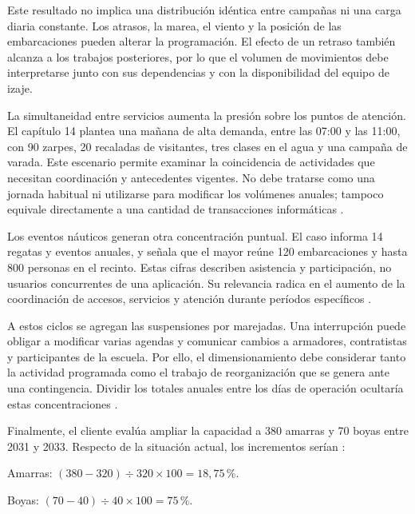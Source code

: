 Este resultado no implica una distribución idéntica entre campañas ni una carga diaria constante. Los atrasos, la marea, el viento y la posición de las embarcaciones pueden alterar la programación. El efecto de un retraso también alcanza a los trabajos posteriores, por lo que el volumen de movimientos debe interpretarse junto con sus dependencias y con la disponibilidad del equipo de izaje.

La simultaneidad entre servicios aumenta la presión sobre los puntos de atención. El capítulo 14 plantea una mañana de alta demanda, entre las 07:00 y las 11:00, con 90 zarpes, 20 recaladas de visitantes, tres clases en el agua y una campaña de varada. Este escenario permite examinar la coincidencia de actividades que necesitan coordinación y antecedentes vigentes. No debe tratarse como una jornada habitual ni utilizarse para modificar los volúmenes anuales; tampoco equivale directamente a una cantidad de transacciones informáticas \parencite[cap.~14, secc.~14.2, p.~33]{pucv-caso07-2026}.

Los eventos náuticos generan otra concentración puntual. El caso informa 14 regatas y eventos anuales, y señala que el mayor reúne 120 embarcaciones y hasta 800 personas en el recinto. Estas cifras describen asistencia y participación, no usuarios concurrentes de una aplicación. Su relevancia radica en el aumento de la coordinación de accesos, servicios y atención durante períodos específicos \parencite[cap.~2, secc.~2.2, p.~6]{pucv-caso07-2026}.

A estos ciclos se agregan las suspensiones por marejadas. Una interrupción puede obligar a modificar varias agendas y comunicar cambios a armadores, contratistas y participantes de la escuela. Por ello, el dimensionamiento debe considerar tanto la actividad programada como el trabajo de reorganización que se genera ante una contingencia. Dividir los totales anuales entre los días de operación ocultaría estas concentraciones \parencite[cap.~4, secc.~4.5, pp.~10-11]{pucv-caso07-2026}.

Finalmente, el cliente evalúa ampliar la capacidad a 380 amarras y 70 boyas entre 2031 y 2033. Respecto de la situación actual, los incrementos serían \parencite[cap.~15, RT-02.12, p.~33]{pucv-caso07-2026}:

\begin{center}
Amarras: $(380 - 320) \div 320 \times 100 = 18{,}75$\,\%.
\end{center}

\begin{center}
Boyas: $(70 - 40) \div 40 \times 100 = 75$\,\%.
\end{center}

